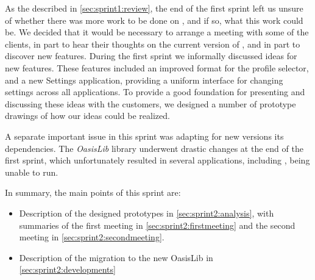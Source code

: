 As the described in \cref{sec:sprint1:review}, the end of the first sprint left us unsure of whether there was more work to be done on \launcher, and if so, what this work could be. 
We decided that it would be necessary to arrange a meeting with some of the clients, in part to hear their thoughts on the current version of \launcher, and in part to discover new features.
During the first sprint we informally discussed ideas for new features.
These features included an improved format for the profile selector, and a new Settings application, providing a uniform interface for changing settings across all applications. 
To provide a good foundation for presenting and discussing these ideas with the customers, we designed a number of prototype drawings of how our ideas could be realized.

A separate important issue in this sprint was adapting \launcher for new versions its dependencies. The \textit{OasisLib} library underwent drastic changes at the end of the first sprint, which unfortunately resulted in several applications, including \launcher, being unable to run.

In summary, the main points of this sprint are:

\begin{itemize}
\item Description of the designed prototypes in \cref{sec:sprint2:analysis}, with summaries of the first meeting in \cref{sec:sprint2:firstmeeting} and the second meeting in \cref{sec:sprint2:secondmeeting}.
\item Description of the migration to the new OasisLib in \cref{sec:sprint2:developments}
\end{itemize}